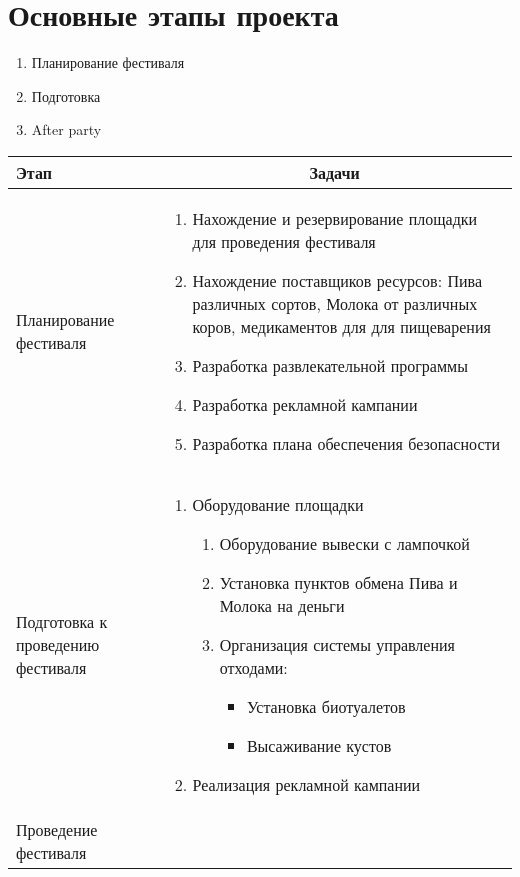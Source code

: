 \documentclass[a4paper,12pt]{article}
\begin{document}
\section{Основные этапы проекта}
\begin{enumerate}
  \item{Планирование фестиваля}
  \item{Подготовка }
  \item{After party}
\end{enumerate}
\begin{center}
\begin{tabular}{|p{2cm}|p{13cm}|}
  \hline
  \textbf{Этап} & \multicolumn{1}{|c|}{\textbf{Задачи}}\\
  \hline
  Планирование фестиваля & 
  \begin{enumerate}
    \item Нахождение и резервирование площадки для проведения фестиваля
    \item Нахождение поставщиков ресурсов: Пива различных сортов, Молока от различных коров, медикаментов для для пищеварения 
    \item Разработка развлекательной программы 
    \item Разработка рекламной кампании
    \item Разработка плана обеспечения безопасности
  \end{enumerate} \\
  \hline
  Подготовка к проведению фестиваля & 
  \begin{enumerate}
    \item Оборудование площадки 
      \begin{enumerate}
        \item Оборудование вывески с лампочкой
        \item Установка пунктов обмена Пива и Молока на деньги 
        \item Организация системы управления отходами:
          \begin{itemize}
            \item Установка биотуалетов
            \item Высаживание кустов
          \end{itemize}
      \end{enumerate}
    \item Реализация рекламной кампании
  \end{enumerate} \\
  \hline
  Проведение фестиваля &
  \begin{enumerate}

\end{enumerate}
\end{tabular}
\end{center}
\end{document}
